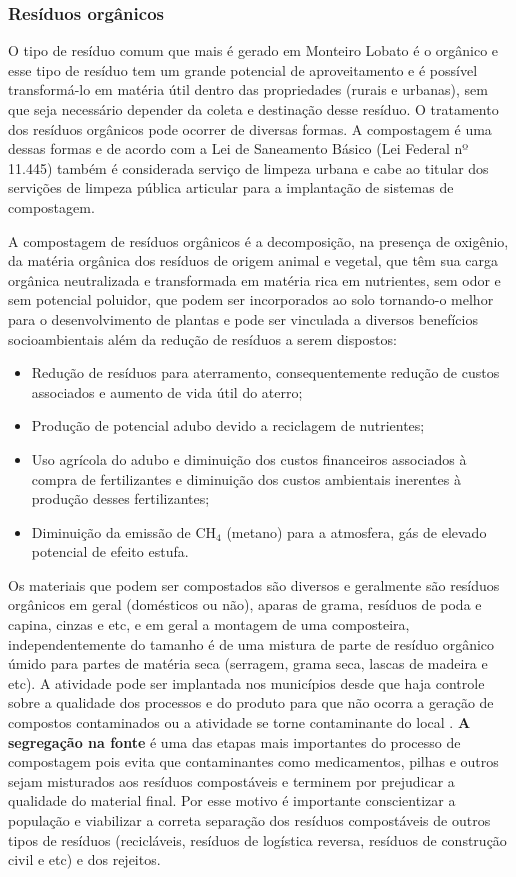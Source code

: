 \subsubsection{Resíduos orgânicos}

O tipo de resíduo comum que mais é gerado em Monteiro Lobato é o orgânico e esse tipo de resíduo tem um grande potencial de aproveitamento e é possível transformá-lo em matéria útil dentro das propriedades (rurais e urbanas), sem que seja necessário depender da coleta e destinação desse resíduo. O tratamento dos resíduos orgânicos pode ocorrer de diversas formas. A compostagem é uma dessas formas e de acordo com a Lei de Saneamento Básico (Lei Federal nº 11.445) também é considerada serviço de limpeza urbana e cabe ao titular dos servições de limpeza pública articular para a implantação de sistemas de compostagem.

A compostagem de resíduos orgânicos é a decomposição, na presença de oxigênio, da matéria orgânica dos resíduos de origem animal e vegetal, que têm sua carga orgânica neutralizada e transformada em matéria rica em nutrientes, sem odor e sem potencial poluidor, que podem ser incorporados ao solo tornando-o melhor para o desenvolvimento de plantas e pode ser vinculada a diversos benefícios socioambientais além da redução de resíduos a serem dispostos:

\begin{itemize}
	\item Redução de resíduos para aterramento, consequentemente redução de custos associados e aumento de vida útil do aterro;
	\item Produção de potencial adubo devido a reciclagem de nutrientes;
	\item Uso agrícola do adubo e diminuição dos custos financeiros associados à compra de fertilizantes e diminuição dos custos ambientais inerentes à produção desses fertilizantes;
	\item Diminuição da emissão de CH$_{4}$ (metano) para a atmosfera, gás de elevado potencial de efeito estufa. 
\end{itemize}

Os materiais que podem ser compostados são diversos e geralmente são resíduos orgânicos em geral (domésticos ou não), aparas de grama, resíduos de poda e capina, cinzas e etc, e em geral a montagem de uma composteira, independentemente do tamanho é de uma mistura de parte de resíduo orgânico úmido para partes de matéria seca (serragem, grama seca, lascas de madeira e etc). A atividade pode ser implantada nos municípios desde que haja controle sobre a qualidade dos processos e do produto para que não ocorra a geração de compostos contaminados ou a atividade se torne contaminante do local \cite{felipetto_conceito_2007}. \textbf{A segregação na fonte} é uma das etapas mais importantes do processo de compostagem pois evita que contaminantes como medicamentos, pilhas e outros sejam misturados aos resíduos compostáveis e terminem por prejudicar a qualidade do material final. Por esse motivo é importante conscientizar a população e viabilizar a correta separação dos resíduos compostáveis de outros tipos de resíduos (recicláveis, resíduos de logística reversa, resíduos de construção civil e etc) e dos rejeitos.


